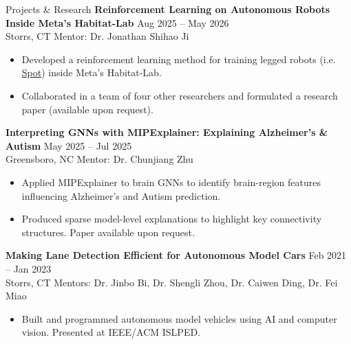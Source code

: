 \documentclass{resume}
\begin{document}

\begin{rSection}{Projects \& Research}
    \textbf{Reinforcement Learning on Autonomous Robots Inside Meta's Habitat-Lab} \hfill Aug 2025 -- May 2026 \\
    Storrs, CT \hfill Mentor: Dr. Jonathan Shihao Ji
    \begin{itemize}
        \itemsep -4pt
        \item Developed a reinforcement learning method for training legged robots (i.e. \href{https://bostondynamics.com/products/spot/}{Spot}) inside Meta's Habitat-Lab.
        \item Collaborated in a team of four other researchers and formulated a research paper (available upon request).
    \end{itemize}

    \textbf{Interpreting GNNs with MIPExplainer: Explaining Alzheimer’s \& Autism} \hfill May 2025 -- Jul 2025 \\
    Greensboro, NC \hfill Mentor: Dr. Chunjiang Zhu
    \begin{itemize}
        \itemsep -4pt
        \item Applied MIPExplainer to brain GNNs to identify brain-region features influencing Alzheimer's and Autism prediction.
        \item Produced sparse model-level explanations to highlight key connectivity structures. Paper available upon request.
    \end{itemize}


    \textbf{Making Lane Detection Efficient for Autonomous Model Cars} \hfill Feb 2021 -- Jan 2023 \\
    Storrs, CT \hfill Mentors: Dr. Jinbo Bi, Dr. Shengli Zhou, Dr. Caiwen Ding, Dr. Fei Miao
    \begin{itemize}
        \itemsep -4pt
        \item Built and programmed autonomous model vehicles using AI and computer vision. Presented at IEEE/ACM ISLPED.
    \end{itemize}
\end{rSection}
\end{document}
